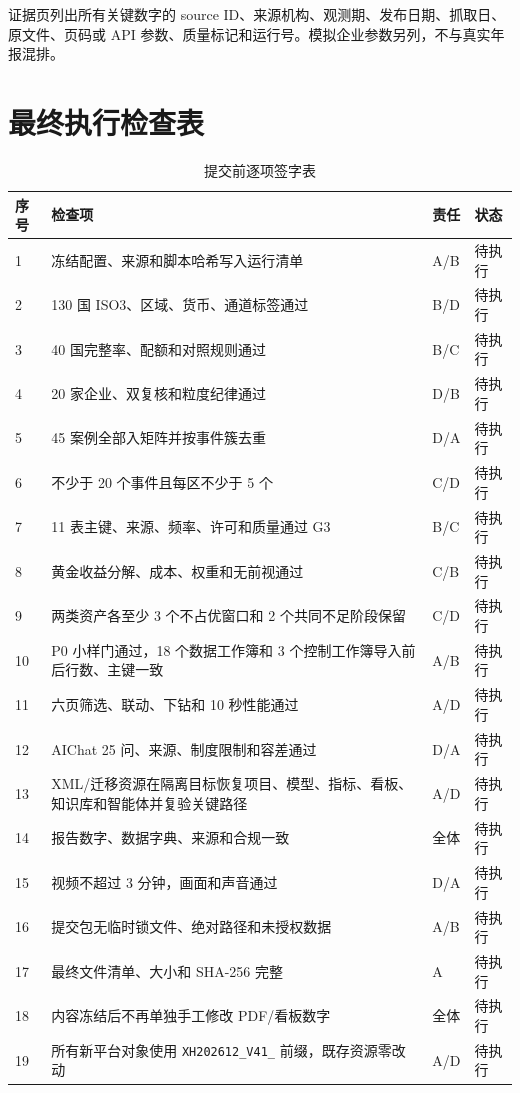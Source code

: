 \documentclass[UTF8,fontset=windows,12pt,openany]{ctexbook}
\newcommand{\Field}[1]{{\small\nolinkurl{#1}}}
\begin{document}
证据页列出所有关键数字的 source ID、来源机构、观测期、发布日期、抓取日、原文件、页码或 API 参数、质量标记和运行号。模拟企业参数另列，不与真实年报混排。

\chapter{最终执行检查表}

\begin{longtable}{p{1.4cm}p{9.1cm}p{1.8cm}p{1.8cm}}
\caption{提交前逐项签字表}\label{tab:final-signoff}\\
\toprule
\textbf{序号} & \textbf{检查项} & \textbf{责任} & \textbf{状态}\\
\midrule
1 & 冻结配置、来源和脚本哈希写入运行清单 & A/B & 待执行\\
2 & 130 国 ISO3、区域、货币、通道标签通过 & B/D & 待执行\\
3 & 40 国完整率、配额和对照规则通过 & B/C & 待执行\\
4 & 20 家企业、双复核和粒度纪律通过 & D/B & 待执行\\
5 & 45 案例全部入矩阵并按事件簇去重 & D/A & 待执行\\
6 & 不少于 20 个事件且每区不少于 5 个 & C/D & 待执行\\
7 & 11 表主键、来源、频率、许可和质量通过 G3 & B/C & 待执行\\
8 & 黄金收益分解、成本、权重和无前视通过 & C/B & 待执行\\
9 & 两类资产各至少 3 个不占优窗口和 2 个共同不足阶段保留 & C/D & 待执行\\
10 & P0 小样门通过，18 个数据工作簿和 3 个控制工作簿导入前后行数、主键一致 & A/B & 待执行\\
11 & 六页筛选、联动、下钻和 10 秒性能通过 & A/D & 待执行\\
12 & AIChat 25 问、来源、制度限制和容差通过 & D/A & 待执行\\
13 & XML/迁移资源在隔离目标恢复项目、模型、指标、看板、知识库和智能体并复验关键路径 & A/D & 待执行\\
14 & 报告数字、数据字典、来源和合规一致 & 全体 & 待执行\\
15 & 视频不超过 3 分钟，画面和声音通过 & D/A & 待执行\\
16 & 提交包无临时锁文件、绝对路径和未授权数据 & A/B & 待执行\\
17 & 最终文件清单、大小和 SHA-256 完整 & A & 待执行\\
18 & 内容冻结后不再单独手工修改 PDF/看板数字 & 全体 & 待执行\\
19 & 所有新平台对象使用 \Field{XH202612_V41_} 前缀，既存资源零改动 & A/D & 待执行\\

\end{longtable}
\end{document}
